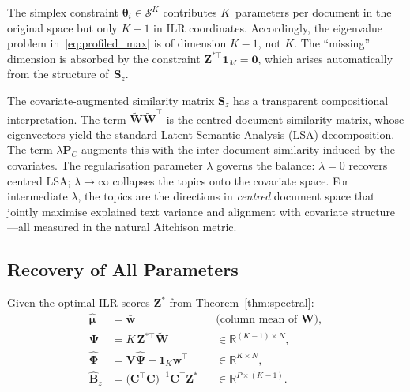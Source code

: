 \begin{remark}
\label{rem:dimension_reduction}
The simplex constraint $\boldsymbol{\theta}_i\in\mathcal{S}^K$
contributes $K$~parameters per document in the original space but only
$K{-}1$ in ILR coordinates. Accordingly, the eigenvalue problem
in~\eqref{eq:profiled_max} is of dimension $K{-}1$, not $K$. The
``missing'' dimension is absorbed by the constraint
$\mathbf{Z}^{*\top}\mathbf{1}_M = \mathbf{0}$, which arises
automatically from the structure of~$\mathbf{S}_z$.
\end{remark}

\begin{remark}
\label{rem:Sz_interpretation}
The covariate-augmented similarity matrix $\mathbf{S}_z$ has a
transparent compositional interpretation. The term
$\widetilde{\mathbf{W}}\widetilde{\mathbf{W}}^{\!\top}$ is the centred
document similarity matrix, whose eigenvectors yield the standard
Latent Semantic Analysis (LSA) decomposition.
The term $\lambda\mathbf{P}_C$ augments this with the inter-document
similarity induced by the covariates.
The regularisation parameter $\lambda$ governs the balance:
$\lambda=0$ recovers centred LSA;
$\lambda\to\infty$ collapses the topics onto the covariate space.
For intermediate $\lambda$, the topics are the directions in
\emph{centred} document space that jointly maximise explained text
variance and alignment with covariate structure---all measured in the
natural Aitchison metric.
\end{remark}


\subsection{Recovery of All Parameters}
\label{subsec:recovery}

\begin{corollary}
\label{cor:recovery}
Given the optimal ILR scores $\mathbf{Z}^*$
from Theorem~\ref{thm:spectral}:
\begin{align}
  \hat{\boldsymbol{\mu}}
    &= \bar{\mathbf{w}}
    &&\text{(column mean of }\mathbf{W}\text{)},
    \label{eq:mu_recovery}\\[4pt]
  \hat{\boldsymbol{\Psi}}
    &= K\,\mathbf{Z}^{*\top}\widetilde{\mathbf{W}}
    &&\in\mathbb{R}^{(K{-}1)\times N},
    \label{eq:Psi_recovery}\\[4pt]
  \hat{\boldsymbol{\Phi}}
    &= \mathbf{V}\hat{\boldsymbol{\Psi}}
       + \mathbf{1}_K\bar{\mathbf{w}}^{\!\top}
    &&\in\mathbb{R}^{K\times N},
    \label{eq:Phi_recovery}\\[4pt]
  \hat{\mathbf{B}}_z
    &= \bigl(\mathbf{C}^{\!\top}\mathbf{C}\bigr)^{-1}
       \mathbf{C}^{\!\top}\mathbf{Z}^*
    &&\in\mathbb{R}^{P\times(K{-}1)}.
    \label{eq:Bz_recovery}
\end{align}
\end{corollary}


